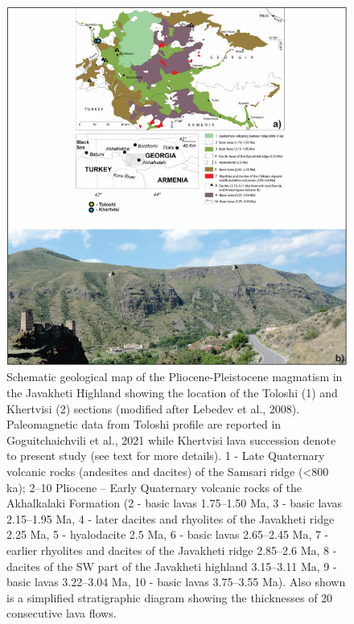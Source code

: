 \documentclass[review]{elsarticle}
\begin{document}
\begin{figure}[htp]
    \centering
    \includegraphics[width=12cm]{2.jpg}
    \caption{Schematic geological map of the Pliocene-Pleistocene magmatism in the Javakheti Highland showing the location of the Toloshi (1) and Khertvisi (2) sections
(modified after Lebedev et al., 2008). Paleomagnetic data from Toloshi profile are reported in Goguitchaichvili et al., 2021 while Khertvisi lava succession denote to
present study (see text for more details).
1 - Late Quaternary volcanic rocks (andesites and dacites) of the Samsari ridge (<800 ka); 2–10 Pliocene – Early Quaternary volcanic rocks of the Akhalkalaki
Formation (2 - basic lavas 1.75–1.50 Ma, 3 - basic lavas 2.15–1.95 Ma, 4 - later dacites and rhyolites of the Javakheti ridge 2.25 Ma, 5 - hyalodacite 2.5 Ma, 6 - basic
lavas 2.65–2.45 Ma, 7 - earlier rhyolites and dacites of the Javakheti ridge 2.85–2.6 Ma, 8 - dacites of the SW part of the Javakheti highland 3.15–3.11 Ma, 9 - basic
lavas 3.22–3.04 Ma, 10 - basic lavas 3.75–3.55 Ma). Also shown is a simplified stratigraphic diagram showing the thicknesses of 20 consecutive lava flows.}
    \label{fig:my_label}
\end{figure}
\end{document}
